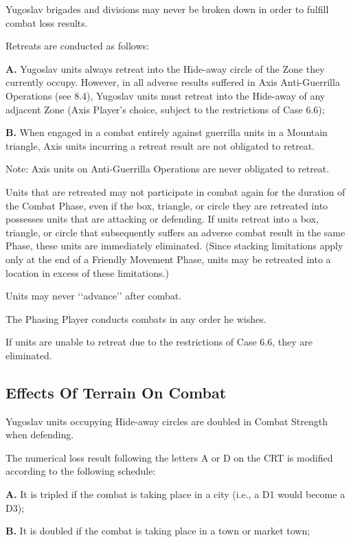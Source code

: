  Yugoslav brigades and divisions may never be broken down in order to fulfill combat loss results.

 Retreats are conducted as follows:

\textbf{A.} Yugoslav units always retreat into the Hide-away circle of the Zone they currently occupy. However, in all adverse results suffered in Axis Anti-Guerrilla Operations (see 8.4), Yugoslav units must retreat into the Hide-away of any adjacent Zone (Axis Player’s choice, subject to the restrictions of Case 6.6);

\textbf{B.} When engaged in a combat entirely against guerrilla units in a Mountain triangle, Axis units incurring a retreat result are not obligated to retreat.

Note: Axis units on Anti-Guerrilla Operations are never obligated to retreat.

 Units that are retreated may not participate in combat again for the duration of the Combat Phase, even if the box, triangle, or circle they are retreated into possesses units that are attacking or defending. If units retreat into a box, triangle, or circle that subsequently suffers an adverse combat result in the same Phase, these units are immediately eliminated. (Since stacking limitations apply only at the end of a Friendly Movement Phase, units may be retreated into a location in excess of these limitations.)

 Units may never ‘‘advance’’ after combat.

 The Phasing Player conducts combats in any order he wishes.

 If units are unable to retreat due to the restrictions of Case 6.6, they are eliminated.

\subsection{Effects Of Terrain On Combat}\label{sec:8.3}

 Yugoslav units occupying Hide-away circles are doubled in Combat Strength when defending.

 The numerical loss result following the letters A or D on the CRT is modified according to the following schedule:

\textbf{A.} It is tripled if the combat is taking place in a city (i.e., a D1 would become a D3);

\textbf{B.} It is doubled if the combat is taking place in a town or market town;

